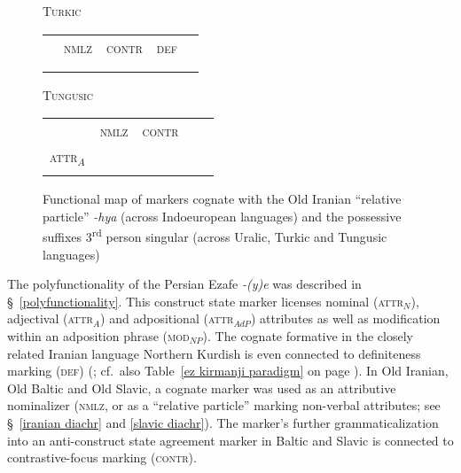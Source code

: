 {\begin{figure}[htbp]
\parbox[b]{0.5\textwidth}{
\begin{center}\textsc{Turkic}\\
\medskip
\begin{tabular}{| c || c | c | c | c}
\cline{1-1}
\\
\cline{1-1}
\\
\hline
 & \textsc{nmlz} & \textsc{contr} & \textsc{def}\\
\hline
\\
\cline{1-1}
\\
\cline{1-1}
\end{tabular}
\end{center}
}
\parbox[b]{0.5\textwidth}{
\begin{center}\textsc{Tungusic}\\
\medskip
\begin{tabular}{| c || c | c | c | c}
\cline{1-1}
\\
\cline{1-1}
\\
\hline
 & \textsc{nmlz} & \textsc{contr} & \\
\hline
\textsc{attr}$_{A}$\\
\cline{1-1}
\\
\cline{1-1}
\end{tabular}
\end{center}
}
\caption[Functional map of cognate devices]{Functional map of markers cognate with the Old Iranian “relative particle” \textit{-hya} (across Indoeuropean languages) and the possessive suffixes 3\textsuperscript{rd} person singular (across Uralic, Turkic and Tungusic languages)}
\label{ie-ural funcmap}
\end{figure}
The polyfunctionality of the Persian Ezafe \textit{-(y)e} was described in \S~\ref{polyfunctionality}. This construct state marker licenses nominal (\textsc{attr}$_{N}$), adjectival (\textsc{attr}$_{A}$) and adpositional (\textsc{attr}$_{AdP}$) attributes as well as modification within an adposition phrase (\textsc{mod}$_{NP}$). The cognate formative in the closely related Iranian language Northern Kurdish  is even connected to definiteness marking (\textsc{def}) (\citealt{schroder2002}; cf.~also Table~\ref{ez kirmanji paradigm} on page \pageref{ez kirmanji paradigm}). In Old Iranian, Old Baltic and Old Slavic, a cognate marker was used as an attributive nominalizer (\textsc{nmlz}, or as a “relative particle” marking non-verbal attributes; see \S~\ref{iranian diachr} and \ref{slavic diachr}). The marker's further grammaticalization into an anti-construct state agreement marker in Baltic and Slavic is connected to contrastive-focus marking (\textsc{contr}).

}
